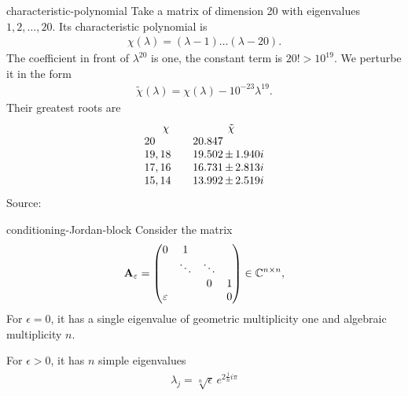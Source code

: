 \begin{Example}{characteristic-polynomial}
  Take a matrix of dimension 20 with eigenvalues $1,2,\ldots,20$. Its
  characteristic polynomial is
  \begin{gather}
    \chi(\lambda) = (\lambda-1)\dots(\lambda-20).
  \end{gather}
  The coefficient in front of $\lambda^{20}$ is one, the constant term is $20! > 10^{19}$.
  We perturbe it in the form
  \begin{gather}
    \tilde \chi(\lambda) = \chi(\lambda) - 10^{-23}\lambda^{19}.
  \end{gather}
  Their greatest roots are
  \begin{gather}
    \begin{array}{l@{\qquad}l@{\,}c@{\,}l}
      \multicolumn{1}{c}{\chi}&
      \multicolumn{3}{c}{\tilde \chi}\\
      20&20.847\\
      19,18&19.502&\pm&1.940i\\
      17,16&16.731&\pm&2.813i\\
      15,14&13.992&\pm&2.519i\\
    \end{array}
  \end{gather}
  {\tiny Source: \cite{DeuflhardHohmann08}}
\end{Example}

\begin{Example}{conditioning-Jordan-block}
  Consider the matrix
  \begin{gather}
  \mathbf A_\varepsilon =
      \begin{pmatrix}
        0&1\\
        &\ddots&\ddots\\
        &&0&1\\
        \varepsilon &&&0
      \end{pmatrix}
      \in\mathbb C^{n\times n},
  \end{gather}
  For $\epsilon=0$, it has a single eigenvalue of geometric multiplicity one and algebraic multiplicity $n$.
  
  For $\epsilon>0$, it has $n$ simple eigenvalues
  \begin{gather}
      \lambda_j = \sqrt[n]{\epsilon} \,e^{2\frac jni\pi}
  \end{gather}
\end{Example}

